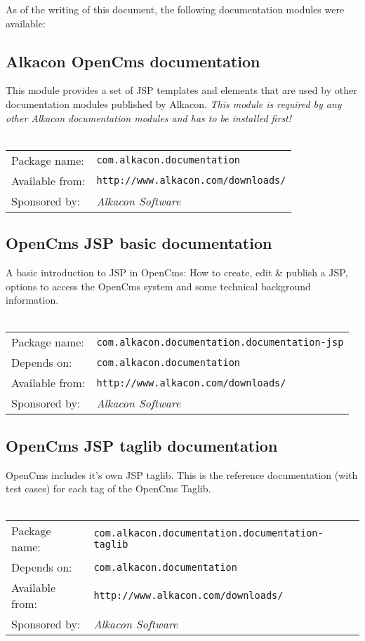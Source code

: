 As of the writing of this document, the following documentation modules were available:

\subsection{Alkacon OpenCms documentation}
This module provides a set of JSP templates and elements that are used by
other documentation modules published by Alkacon. {\em This module is required
by any other Alkacon documentation modules and has to be installed first!}
\\
\\
\begin{tabular}{ll}
Package name: & {\tt com.alkacon.documentation}\\
Available from: & {\tt http://www.alkacon.com/downloads/}\\
Sponsored by: & {\em Alkacon Software}\\
\end{tabular}

\subsection{OpenCms JSP basic documentation}
A basic introduction to JSP in OpenCms: How to create, edit \& publish a JSP, options to access 
the OpenCms system and some technical background information.
\\
\\
\begin{tabular}{ll}
Package name: & {\tt com.alkacon.documentation.documentation-jsp}\\
Depends on: & {\tt com.alkacon.documentation}\\
Available from: & {\tt http://www.alkacon.com/downloads/}\\
Sponsored by: & {\em Alkacon Software}\\
\end{tabular}

\subsection{OpenCms JSP taglib documentation}
OpenCms includes it's own JSP taglib. This is the reference documentation (with test cases) for 
each tag of the OpenCms Taglib.
\\
\\
\begin{tabular}{ll}
Package name: & {\tt com.alkacon.documentation.documentation-taglib}\\
Depends on: & {\tt com.alkacon.documentation}\\
Available from: & {\tt http://www.alkacon.com/downloads/}\\
Sponsored by: & {\em Alkacon Software}\\
\end{tabular}


